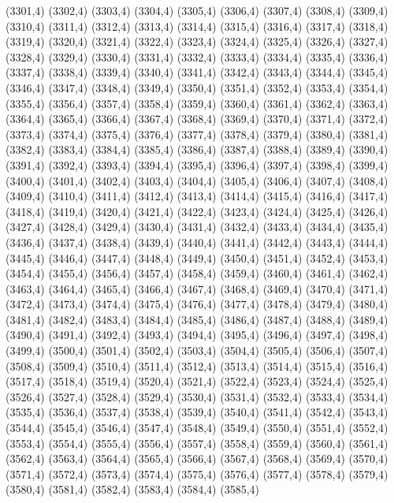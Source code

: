 (3301,4)
(3302,4)
(3303,4)
(3304,4)
(3305,4)
(3306,4)
(3307,4)
(3308,4)
(3309,4)
(3310,4)
(3311,4)
(3312,4)
(3313,4)
(3314,4)
(3315,4)
(3316,4)
(3317,4)
(3318,4)
(3319,4)
(3320,4)
(3321,4)
(3322,4)
(3323,4)
(3324,4)
(3325,4)
(3326,4)
(3327,4)
(3328,4)
(3329,4)
(3330,4)
(3331,4)
(3332,4)
(3333,4)
(3334,4)
(3335,4)
(3336,4)
(3337,4)
(3338,4)
(3339,4)
(3340,4)
(3341,4)
(3342,4)
(3343,4)
(3344,4)
(3345,4)
(3346,4)
(3347,4)
(3348,4)
(3349,4)
(3350,4)
(3351,4)
(3352,4)
(3353,4)
(3354,4)
(3355,4)
(3356,4)
(3357,4)
(3358,4)
(3359,4)
(3360,4)
(3361,4)
(3362,4)
(3363,4)
(3364,4)
(3365,4)
(3366,4)
(3367,4)
(3368,4)
(3369,4)
(3370,4)
(3371,4)
(3372,4)
(3373,4)
(3374,4)
(3375,4)
(3376,4)
(3377,4)
(3378,4)
(3379,4)
(3380,4)
(3381,4)
(3382,4)
(3383,4)
(3384,4)
(3385,4)
(3386,4)
(3387,4)
(3388,4)
(3389,4)
(3390,4)
(3391,4)
(3392,4)
(3393,4)
(3394,4)
(3395,4)
(3396,4)
(3397,4)
(3398,4)
(3399,4)
(3400,4)
(3401,4)
(3402,4)
(3403,4)
(3404,4)
(3405,4)
(3406,4)
(3407,4)
(3408,4)
(3409,4)
(3410,4)
(3411,4)
(3412,4)
(3413,4)
(3414,4)
(3415,4)
(3416,4)
(3417,4)
(3418,4)
(3419,4)
(3420,4)
(3421,4)
(3422,4)
(3423,4)
(3424,4)
(3425,4)
(3426,4)
(3427,4)
(3428,4)
(3429,4)
(3430,4)
(3431,4)
(3432,4)
(3433,4)
(3434,4)
(3435,4)
(3436,4)
(3437,4)
(3438,4)
(3439,4)
(3440,4)
(3441,4)
(3442,4)
(3443,4)
(3444,4)
(3445,4)
(3446,4)
(3447,4)
(3448,4)
(3449,4)
(3450,4)
(3451,4)
(3452,4)
(3453,4)
(3454,4)
(3455,4)
(3456,4)
(3457,4)
(3458,4)
(3459,4)
(3460,4)
(3461,4)
(3462,4)
(3463,4)
(3464,4)
(3465,4)
(3466,4)
(3467,4)
(3468,4)
(3469,4)
(3470,4)
(3471,4)
(3472,4)
(3473,4)
(3474,4)
(3475,4)
(3476,4)
(3477,4)
(3478,4)
(3479,4)
(3480,4)
(3481,4)
(3482,4)
(3483,4)
(3484,4)
(3485,4)
(3486,4)
(3487,4)
(3488,4)
(3489,4)
(3490,4)
(3491,4)
(3492,4)
(3493,4)
(3494,4)
(3495,4)
(3496,4)
(3497,4)
(3498,4)
(3499,4)
(3500,4)
(3501,4)
(3502,4)
(3503,4)
(3504,4)
(3505,4)
(3506,4)
(3507,4)
(3508,4)
(3509,4)
(3510,4)
(3511,4)
(3512,4)
(3513,4)
(3514,4)
(3515,4)
(3516,4)
(3517,4)
(3518,4)
(3519,4)
(3520,4)
(3521,4)
(3522,4)
(3523,4)
(3524,4)
(3525,4)
(3526,4)
(3527,4)
(3528,4)
(3529,4)
(3530,4)
(3531,4)
(3532,4)
(3533,4)
(3534,4)
(3535,4)
(3536,4)
(3537,4)
(3538,4)
(3539,4)
(3540,4)
(3541,4)
(3542,4)
(3543,4)
(3544,4)
(3545,4)
(3546,4)
(3547,4)
(3548,4)
(3549,4)
(3550,4)
(3551,4)
(3552,4)
(3553,4)
(3554,4)
(3555,4)
(3556,4)
(3557,4)
(3558,4)
(3559,4)
(3560,4)
(3561,4)
(3562,4)
(3563,4)
(3564,4)
(3565,4)
(3566,4)
(3567,4)
(3568,4)
(3569,4)
(3570,4)
(3571,4)
(3572,4)
(3573,4)
(3574,4)
(3575,4)
(3576,4)
(3577,4)
(3578,4)
(3579,4)
(3580,4)
(3581,4)
(3582,4)
(3583,4)
(3584,4)
(3585,4)